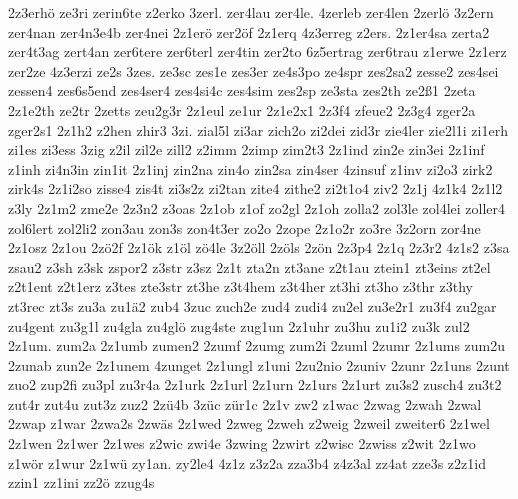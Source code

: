 {2z3erhö
ze3ri
zerin6te
z2erko
3zerl.
zer4lau
zer4le.
4zerleb
zer4len
2zerlö
3z2ern
zer4nan
zer4n3e4b
zer4nei
2z1erö
zer2öf
2z1erq
4z3erreg
z2ers.
2z1er4sa
zerta2
zer4t3ag
zert4an
zer6tere
zer6terl
zer4tin
zer2to
6z5ertrag
zer6trau
z1erwe
2z1erz
zer2ze
4z3erzi
ze2s
3zes.
ze3sc
zes1e
zes3er
ze4s3po
ze4spr
zes2sa2
zesse2
zes4sei
zessen4
zes6s5end
zes4ser4
zes4si4c
zes4sim
zes2sp
ze3sta
zes2th
ze2ß1
2zeta
2z1e2th
ze2tr
2zetts
zeu2g3r
2z1eul
ze1ur
2z1e2x1
2z3f4
zfeue2
2z3g4
zger2a
zger2s1
2z1h2
z2hen
zhir3
3zi.
zial5l
zi3ar
zich2o
zi2dei
zid3r
zie4ler
zie2l1i
zi1erh
zi1es
zi3ess
3zig
z2il
zil2e
zill2
z2imm
2zimp
zim2t3
2z1ind
zin2e
zin3ei
2z1inf
z1inh
zi4n3in
zin1it
2z1inj
zin2na
zin4o
zin2sa
zin4ser
4zinsuf
z1inv
zi2o3
zirk2
zirk4s
2z1i2so
zisse4
zis4t
zi3s2z
zi2tan
zite4
zithe2
zi2t1o4
ziv2
2z1j
4z1k4
2z1l2
z3ly
2z1m2
zme2e
2z3n2
z3oas
2z1ob
z1of
zo2gl
2z1oh
zolla2
zol3le
zol4lei
zoller4
zol6lert
zol2li2
zon3au
zon3s
zon4t3er
zo2o
2zope
2z1o2r
zo3re
3z2orn
zor4ne
2z1osz
2z1ou
2zö2f
2z1ök
z1öl
zö4le
3z2öll
2zöls
2zön
2z3p4
2z1q
2z3r2
4z1s2
z3sa
zsau2
z3sh
z3sk
zspor2
z3str
z3sz
2z1t
zta2n
zt3ane
z2t1au
ztein1
zt3eins
zt2el
z2t1ent
z2t1erz
z3tes
zte3str
zt3he
z3t4hem
z3t4her
zt3hi
zt3ho
z3thr
z3thy
zt3rec
zt3s
zu3a
zu1ä2
zub4
3zuc
zuch2e
zud4
zudi4
zu2el
zu3e2r1
zu3f4
zu2gar
zu4gent
zu3g1l
zu4gla
zu4glö
zug4ste
zug1un
2z1uhr
zu3hu
zu1i2
zu3k
zul2
2z1um.
zum2a
2z1umb
zumen2
2zumf
2zumg
zum2i
2zuml
2zumr
2z1ums
zum2u
2zunab
zun2e
2z1unem
4zunget
2z1ungl
z1uni
2zu2nio
2zuniv
2zunr
2z1uns
2zunt
zuo2
zup2fi
zu3pl
zu3r4a
2z1urk
2z1url
2z1urn
2z1urs
2z1urt
zu3s2
zusch4
zu3t2
zut4r
zut4u
zut3z
zuz2
2zü4b
3züc
zür1c
2z1v
zw2
z1wac
2zwag
2zwah
2zwal
2zwap
z1war
2zwa2s
2zwäs
2z1wed
2zweg
2zweh
z2weig
2zweil
zweiter6
2z1wel
2z1wen
2z1wer
2z1wes
z2wic
zwi4e
3zwing
2zwirt
z2wisc
2zwiss
z2wit
2z1wo
z1wör
z1wur
2z1wü
zy1an.
zy2le4
4z1z
z3z2a
zza3b4
z4z3al
zz4at
zze3s
z2z1id
zzin1
zz1ini
zz2ö
zzug4s
}

\endinput

